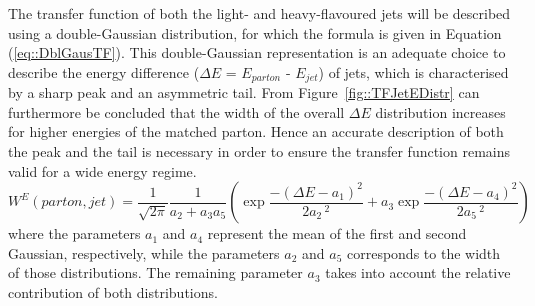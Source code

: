 The transfer function of both the light- and heavy-flavoured jets will be described using a double-Gaussian distribution, for which the formula is given in Equation (\ref{eq::DblGausTF}).
This double-Gaussian representation is an adequate choice to describe the energy difference ($\Delta E$ = $E_{parton}$ - $E_{jet}$) of jets, which is characterised by a sharp peak and an asymmetric tail. 
From Figure~\ref{fig::TFJetEDistr} can furthermore be concluded that the width of the overall $\Delta E$ distribution increases for higher energies of the matched parton. Hence an accurate description of both the peak and the tail is necessary in order to ensure the transfer function remains valid for a wide energy regime.
\begin{equation} \label{eq::DblGausTF}
 W^{E}(parton, jet) = \frac{1}{\sqrt{2\pi}} \frac{1}{a_2 + a_3 a_5} \left( \exp \frac{-(\Delta E - a_1)^2}{2 a_2 \,^{2}} + a_3 \exp \frac{-(\Delta E - a_4)^2}{2 a_5 \,^{2}} \right) 
\end{equation}
where the parameters $a_1$ and $a_4$ represent the mean of the first and second Gaussian, respectively, while the parameters $a_2$ and $a_5$ corresponds to the width of those distributions.
The remaining parameter $a_3$ takes into account the relative contribution of both distributions.
\\

